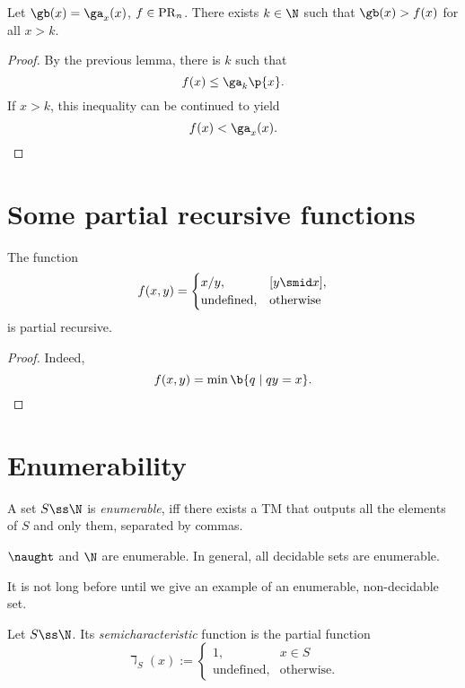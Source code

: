 \begin{theorem}
  Let $\gb(x) = \ga_x(x)$, $f \in \operatorname{PR}_n$. There exists $k \in \N$ such that $\gb(x) > f(x)$ for all $x > k$.
\end{theorem}

\begin{proof}
  By the previous lemma, there is $k$ such that
  $$ f(x) \le \ga_k\p{x}. $$
  If $x > k$, this inequality can be continued to yield
  $$ f(x) < \ga_x(x). $$
\end{proof}

\section{Some partial recursive functions}

\newcommand{\und}[0]{\text{undefined}}
\newcommand{\oth}[0]{\text{otherwise}}

\begin{lemma}
  The function
  $$
  f(x, y) =
  \begin{cases}
    x/y, & [y \smid x], \\
    \und, & \oth
  \end{cases}
  $$
  is partial recursive.
\end{lemma}

\begin{proof}
  Indeed,
  $$ f(x, y) = \min\b{ q \mid qy = x }. $$
\end{proof}

\section{Enumerability}

\begin{definition}
  A set $S \ss \N$ is \emph{enumerable}, iff there exists a TM that outputs all the elements of $S$ and only them, separated by commas.
\end{definition}

\begin{example}
  $\naught$ and $\N$ are enumerable.
  In general, all decidable sets are enumerable.
\end{example}

It is not long before until we give an example of an enumerable, non-decidable set.

\begin{definition}
  Let $S \ss \N$.
  Its \emph{semicharacteristic} function is the partial function
  $$ \daleth_S(x) := \begin{cases}
    1, & x \in S \\
    \und, & \oth.
  \end{cases}
  $$
\end{definition}

